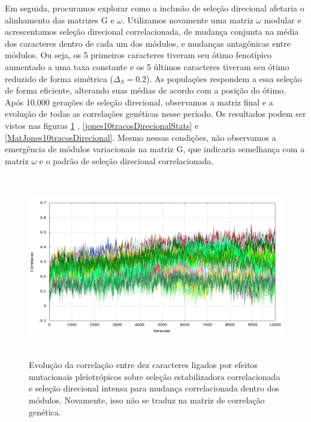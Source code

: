 Em seguida, procuramos explorar como a inclusão de seleção direcional afetaria o
alinhamento das matrizes G e $\omega$. 
Utilizamos novamente uma matriz $\omega$ modular e acrescentamos seleção
direcional correlacionada, de mudança conjunta na média dos caracteres
dentro de cada um dos módulos, e mudanças antagônicas entre módulos. 
Ou seja, os 5 primeiros caracteres tiveram seu ótimo fenotípico aumentado a
uma taxa constante e os 5 últimos caracteres tiveram seu ótimo reduzido de
forma simétrica ($\Delta_S=0.2$). 
As populações respondem a essa seleção de forma eficiente, alterando
suas médias de acordo com a posição do ótimo. 
Após 10.000 gerações de seleção direcional, observamos a matriz final
e a evolução de todas as correlações genéticas nesse período. 
Os resultados podem ser vistos nas figuras \ref{jones10tracosDirecional}
, \ref{jones10tracosDirecionalStats} e \ref{MatJones10tracosDirecional}. 
Mesmo nessas condições, não observamos a emergência de módulos
variacionais na matriz G, que indicaria semelhança com a matriz $\omega$
e o padrão de seleção direcional correlacionada. 


\begin{figure}[htbp]
  \centering
  \includegraphics[width=150mm, height=80mm]{figuras/jones10tracosDirecional.png}
  \caption{Evolução da correlação entre dez caracteres ligados por efeitos
  mutacionais pleiotrópicos sobre seleção estabilizadora correlacionada
  e seleção direcional intensa para mudança correlacionada dentro dos
  módulos. Novamente, isso não se traduz na matriz de correlação genética.}
  \label{jones10tracosDirecional}
\end{figure}



